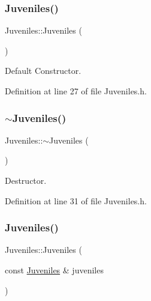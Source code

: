 \subsubsection{\texorpdfstring{Juveniles()}{Juveniles()}\hspace{0.1cm}{\footnotesize\ttfamily [1/2]}}
{\footnotesize\ttfamily Juveniles\+::\+Juveniles (\begin{DoxyParamCaption}{ }\end{DoxyParamCaption})\hspace{0.3cm}{\ttfamily [inline]}}



Default Constructor. 



Definition at line 27 of file Juveniles.\+h.

\hypertarget{class_juveniles_a10fac329b43ff6a3c66f115ef61e166c}{}\label{class_juveniles_a10fac329b43ff6a3c66f115ef61e166c} 
\subsubsection{\texorpdfstring{$\sim$\+Juveniles()}{~Juveniles()}}
{\footnotesize\ttfamily Juveniles\+::$\sim$\+Juveniles (\begin{DoxyParamCaption}{ }\end{DoxyParamCaption})\hspace{0.3cm}{\ttfamily [inline]}}



Destructor. 



Definition at line 31 of file Juveniles.\+h.

\hypertarget{class_juveniles_a8a0e4b739295e6ec014de47125e3479f}{}\label{class_juveniles_a8a0e4b739295e6ec014de47125e3479f} 
\subsubsection{\texorpdfstring{Juveniles()}{Juveniles()}\hspace{0.1cm}{\footnotesize\ttfamily [2/2]}}
{\footnotesize\ttfamily Juveniles\+::\+Juveniles (\begin{DoxyParamCaption}\item[{const \hyperlink{class_juveniles}{Juveniles} \&}]{juveniles }\end{DoxyParamCaption})\hspace{0.3cm}{\ttfamily [inline]}}



